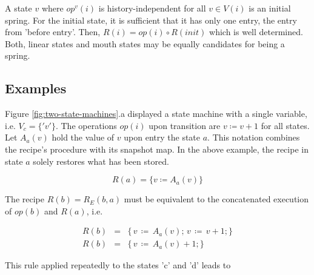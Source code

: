 \documentclass[12pt,a4paper]{scrartcl}
\begin{document}
A state $v$ where $op^v(i)$ is history-independent for all $v\in V(i)$ is an initial
spring. For the initial state, it is sufficient that it has only one entry, the
entry from 'before entry'. Then, $R(i) = op(i)\circ R(init)$ which is well
determined.  Both, linear states and mouth states may be equally candidates for
being a spring.

\subsection{Examples}
                 
Figure \ref{fig:two-state-machines}.a displayed a state machine with a single
variable, i.e. $V_c=\{'v'\}$. The operations $op(i)$ upon transition are
$v\coloneqq v+1$ for all states. Let $A_a(v)$ hold the value of $v$ upon entry the
state $a$.  This notation combines the recipe's procedure with its snapshot
map.  In the above example, the recipe in state $a$ solely restores what has
been stored.

\begin{equation} 
    R(a) = \{ v \coloneqq  A_a(v) \} 
\end{equation}

The recipe $R(b)=R_E(b,a)$ must be equivalent to the concatenated execution of
$op(b)$ and $R(a)$, i.e.

\begin{eqnarray}
    R(b)&=&\{\,v\,\coloneqq \,A_a(v);\,v\,\coloneqq \,v + 1;\} \\
    R(b)&=&\{\,v\,\coloneqq \,A_a(v) + 1; \}                                 
\end{eqnarray}

This rule applied repeatedly to the states 'c' and 'd' leads to
\end{document}

